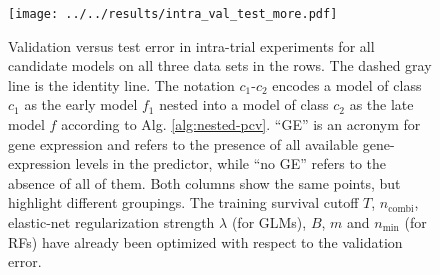\begin{figure}
    \centering
    \texttt{[image: ../../results/intra\_val\_test\_more.pdf]}
    \caption{Validation versus test error in intra-trial experiments for all candidate models on 
        all three data sets in the rows. The dashed 
        gray line is the identity line. The notation 
        $c_1$-$c_2$ encodes a model of class $c_1$ as the early model $f_1$ nested into a model of 
        class $c_2$ as the late model $f$ according to Alg. \ref{alg:nested-pcv}.
        ``GE'' is an acronym for gene expression and refers to the presence of all available 
        gene-expression levels in the predictor, while ``no GE'' refers to the absence of all of 
        them. Both columns show 
        the same points, but highlight different groupings. The training survival cutoff $T$, 
        $n_\text{combi}$, elastic-net regularization strength $\lambda$ (for GLMs), 
        $B$, $m$ and $n_\text{min}$ (for RFs) have already been optimized with respect to the 
        validation error. }
    \label{fig:intra-val-test-more}
\end{figure}